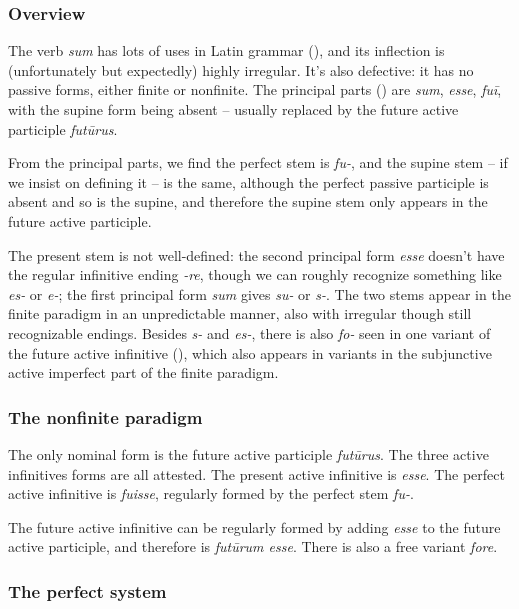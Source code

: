 \documentclass[a4paper, oneside, 12pt]{report}
\newcommand{\form}[1]{\emph{#1}}
\begin{document}
\subsubsection{Overview}

The verb \form{sum} has lots of uses in Latin grammar (),
and its inflection is (unfortunately but expectedly) highly irregular.
It's also defective: 
it has no passive forms, either finite or nonfinite.
The principal parts () are 
\form{sum}, \form{esse}, \form{fuī}, 
with the supine form being absent -- usually replaced by the future active participle \form{futūrus}.

From the principal parts, 
we find the perfect stem is \form{fu-}, 
and the supine stem -- if we insist on defining it -- 
is the same, 
although the perfect passive participle is absent and so is the supine,
and therefore the supine stem only appears in the future active participle.

The present stem is not well-defined:
the second principal form \form{esse}
doesn't have the regular infinitive ending \form{-re},
though we can roughly recognize something like \form{es-} or \form{e-};
the first principal form \form{sum} gives \form{su-} or \form{s-}.
The two stems appear in the finite paradigm in an unpredictable manner, 
also with irregular though still recognizable endings.
Besides \form{s-} and \form{es-},
there is also \form{fo-} seen in one variant of the future active infinitive
(),
which also appears in variants in
the subjunctive active imperfect part of the finite paradigm.

\subsubsection{The nonfinite paradigm}\label{sec:verb-inflection.irregular.sum.nonfinite}

The only nominal form is the future active participle \form{futūrus}.
The three active infinitives forms are all attested.
The present active infinitive is \form{esse}.
The perfect active infinitive is \form{fuisse}, 
regularly formed by the perfect stem \form{fu-}.

The future active infinitive can be regularly formed by adding \form{esse} 
to the future active participle,
and therefore is \form{futūrum esse}.
There is also a free variant \form{fore}.

\subsubsection{The perfect system}
\end{document}
